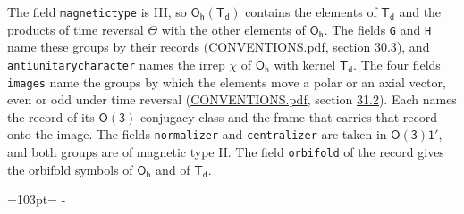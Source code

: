 \documentclass[10pt,a4paper]{article}
\newcommand{\needspace}[1]{\par\penalty-100\begingroup\dimen0=#1\relax\dimen2=\pagegoal
  \advance\dimen2-\pagetotal\ifdim\dimen0>\dimen2\relax\ifdim\dimen2>0pt\vfil\break\fi\fi
  \endgroup}
\numberwithin{equation}{section}
\newcommand{\grp}[1]{\mathsf{#1}}
\begin{document}
The field \texttt{magnetictype} is III, so $\grp{O_{h}}(\grp{T_{d}})$ contains the elements of $\grp{T_{d}}$ and the products of time reversal $\varTheta$ with the other elements of $\grp{O_{h}}$. The fields \texttt{G} and \texttt{H} name these groups by their records (\href{../../CONVENTIONS.pdf}{CONVENTIONS.pdf}, section \href{../../CONVENTIONS.pdf\#conv.30.3}{30.3}), and \texttt{antiunitarycharacter} names the irrep $\chi$ of $\grp{O_{h}}$ with kernel $\grp{T_{d}}$. The four fields \texttt{images} name the groups by which the elements move a polar or an axial vector, even or odd under time reversal (\href{../../CONVENTIONS.pdf}{CONVENTIONS.pdf}, section \href{../../CONVENTIONS.pdf\#conv.31.2}{31.2}). Each names the record of its $\grp{O(3)}$-conjugacy class and the frame that carries that record onto the image. The fields \texttt{normalizer} and \texttt{centralizer} are taken in $\grp{O(3)1'}$, and both groups are of magnetic type II. The field \texttt{orbifold} of the record gives the orbifold symbols of $\grp{O_{h}}$ and of $\grp{T_{d}}$.
\needspace{103pt}
\end{document}
